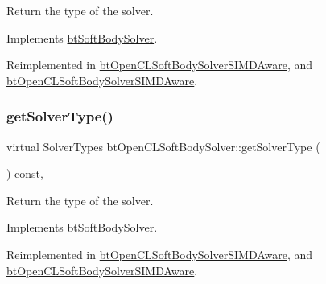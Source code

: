 Return the type of the solver. 

Implements \hyperlink{classbtSoftBodySolver_aa08308ddb8e4661ab3c3e23cf3da647c}{bt\+Soft\+Body\+Solver}.



Reimplemented in \hyperlink{classbtOpenCLSoftBodySolverSIMDAware_a34d8e98c8756aeeac24554c18f06c0c1}{bt\+Open\+C\+L\+Soft\+Body\+Solver\+S\+I\+M\+D\+Aware}, and \hyperlink{classbtOpenCLSoftBodySolverSIMDAware_a34d8e98c8756aeeac24554c18f06c0c1}{bt\+Open\+C\+L\+Soft\+Body\+Solver\+S\+I\+M\+D\+Aware}.

\mbox{\label{classbtOpenCLSoftBodySolver_a2b643547caacc5c1daedff3f67a140fb}} 
\subsubsection{\texorpdfstring{get\+Solver\+Type()}{getSolverType()}\hspace{0.1cm}{\footnotesize\ttfamily [2/2]}}
{\footnotesize\ttfamily virtual Solver\+Types bt\+Open\+C\+L\+Soft\+Body\+Solver\+::get\+Solver\+Type (\begin{DoxyParamCaption}{ }\end{DoxyParamCaption}) const\hspace{0.3cm}{\ttfamily [inline]}, {\ttfamily [virtual]}}

Return the type of the solver. 

Implements \hyperlink{classbtSoftBodySolver_aa08308ddb8e4661ab3c3e23cf3da647c}{bt\+Soft\+Body\+Solver}.



Reimplemented in \hyperlink{classbtOpenCLSoftBodySolverSIMDAware_a34d8e98c8756aeeac24554c18f06c0c1}{bt\+Open\+C\+L\+Soft\+Body\+Solver\+S\+I\+M\+D\+Aware}, and \hyperlink{classbtOpenCLSoftBodySolverSIMDAware_a34d8e98c8756aeeac24554c18f06c0c1}{bt\+Open\+C\+L\+Soft\+Body\+Solver\+S\+I\+M\+D\+Aware}.

\mbox{\label{classbtOpenCLSoftBodySolver_ad52983f1059032ef7f89416442cc911c}} 
